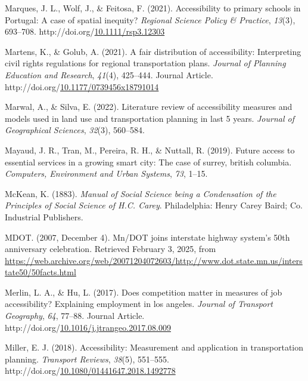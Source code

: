 \documentclass[
11pt, %
oneside, %
english, %
singlespacing, %
]{macthesis} %
\newlength{\cslhangindent}
\newenvironment{CSLReferences}[2] %
{\begin{list}{}{%
	\setlength{\itemindent}{0pt}
	\setlength{\leftmargin}{0pt}
	\setlength{\parsep}{0pt}
	\ifodd #1
	\setlength{\leftmargin}{\cslhangindent}
	\setlength{\itemindent}{-1\cslhangindent}
	\fi
	\setlength{\itemsep}{#2\baselineskip}}}
{\end{list}}
\begin{document}
\begin{CSLReferences}{1}{0}
Marques, J. L., Wolf, J., \& Feitosa, F. (2021). Accessibility to primary schools in {Portugal}: A case of spatial inequity? \emph{Regional Science Policy \& Practice}, \emph{13}(3), 693--708. http://doi.org/\href{https://doi.org/10.1111/rsp3.12303}{10.1111/rsp3.12303}

Martens, K., \& Golub, A. (2021). A fair distribution of accessibility: Interpreting civil rights regulations for regional transportation plans. \emph{Journal of Planning Education and Research}, \emph{41}(4), 425--444. Journal Article. http://doi.org/\href{https://doi.org/10.1177/0739456x18791014}{10.1177/0739456x18791014}

Marwal, A., \& Silva, E. (2022). Literature review of accessibility measures and models used in land use and transportation planning in last 5 years. \emph{Journal of Geographical Sciences}, \emph{32}(3), 560--584.

Mayaud, J. R., Tran, M., Pereira, R. H., \& Nuttall, R. (2019). Future access to essential services in a growing smart city: The case of surrey, british columbia. \emph{Computers, Environment and Urban Systems}, \emph{73}, 1--15.

McKean, K. (1883). \emph{Manual of {Social} {Science} being a {Condensation} of the {Principles} of {Social} {Science} of {H}.{C}. {Carey}}. Philadelphia: Henry Carey Baird; Co. Industrial Publishers.

MDOT. (2007, December 4). Mn/{DOT} joins interstate highway system's 50th anniversary celebration. Retrieved February 3, 2025, from \url{https://web.archive.org/web/20071204072603/http://www.dot.state.mn.us/interstate50/50facts.html}

Merlin, L. A., \& Hu, L. (2017). Does competition matter in measures of job accessibility? Explaining employment in los angeles. \emph{Journal of Transport Geography}, \emph{64}, 77--88. Journal Article. http://doi.org/\href{https://doi.org/10.1016/j.jtrangeo.2017.08.009}{10.1016/j.jtrangeo.2017.08.009}

Miller, E. J. (2018). Accessibility: Measurement and application in transportation planning. \emph{Transport Reviews}, \emph{38}(5), 551--555. http://doi.org/\href{https://doi.org/10.1080/01441647.2018.1492778}{10.1080/01441647.2018.1492778}


\end{CSLReferences}
\end{document}
